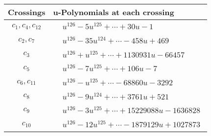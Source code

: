 \documentclass[1p]{elsarticle_modified}
\theoremstyle{definition}
\begin{document}
\begin{tabular}{m{50pt}|m{274pt}}
Crossings & \hspace{64pt}u-Polynomials at each crossing \\
\hline $$\begin{aligned}c_{1},c_{4},c_{12}\end{aligned}$$&$\begin{aligned}
&u^{126}-5 u^{125}+\cdots+30 u-1
\end{aligned}$\\
\hline $$\begin{aligned}c_{2},c_{7}\end{aligned}$$&$\begin{aligned}
&u^{126}-35 u^{124}+\cdots-458 u+469
\end{aligned}$\\
\hline $$\begin{aligned}c_{3}\end{aligned}$$&$\begin{aligned}
&u^{126}+u^{125}+\cdots+1130931 u-66457
\end{aligned}$\\
\hline $$\begin{aligned}c_{5}\end{aligned}$$&$\begin{aligned}
&u^{126}-7 u^{125}+\cdots+106 u-7
\end{aligned}$\\
\hline $$\begin{aligned}c_{6},c_{11}\end{aligned}$$&$\begin{aligned}
&u^{126}- u^{125}+\cdots-68860 u-3292
\end{aligned}$\\
\hline $$\begin{aligned}c_{8}\end{aligned}$$&$\begin{aligned}
&u^{126}-9 u^{124}+\cdots+3761 u+521
\end{aligned}$\\
\hline $$\begin{aligned}c_{9}\end{aligned}$$&$\begin{aligned}
&u^{126}-3 u^{125}+\cdots+15229088 u-1636828
\end{aligned}$\\
\hline $$\begin{aligned}c_{10}\end{aligned}$$&$\begin{aligned}
&u^{126}-12 u^{125}+\cdots-1879129 u+1027873
\end{aligned}$\\
\hline
\end{tabular}\\~\\
\end{document}

